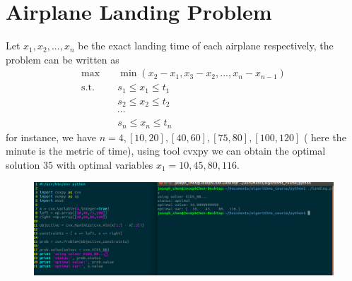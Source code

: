 \section{Airplane Landing Problem}
 Let $x_1, x_2,...,x_n $ be the exact landing time of each airplane respectively, the problem can be written as 
 \[	\begin{split} 
	 \max  \quad &\min(x_2 - x_1, x_3 - x_2, ..., x_n - x_{n-1}) \\
	 \text{s.t.} \quad & s_1 \leq x_1 \leq t_1 \\
	 & s_2 \leq x_2 \leq t_2  \\
	 &\cdots \\
	 & s_n \leq x_n \leq t_n
	\end{split}  
 \]
 for instance, we have $n = 4, [10,20],[40,60],[75,80],[100,120]$ ( here the minute is the metric of time),
 using tool cvxpy we can obtain the optimal solution $35$ with optimal variables $x_1 = 10, 45,80,116$.
 \begin{figure}[H]
 	\centering
 	\includegraphics[width=.8\textwidth]{work4/landing}
 \end{figure}
